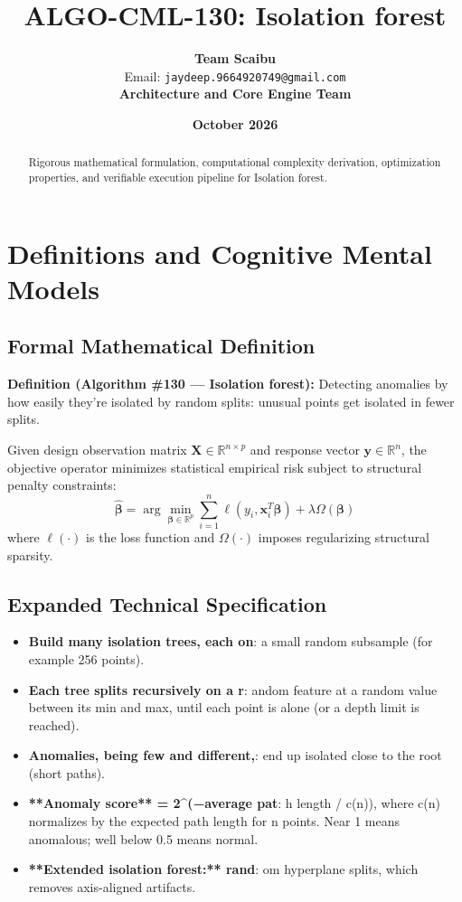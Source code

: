 \documentclass[11pt,a4paper]{article}
\title{\textbf{ALGO-CML-130: Isolation forest}}
\author{\textbf{Team Scaibu} \\ \small Email: \texttt{jaydeep.9664920749@gmail.com} \\ \small \textbf{Architecture and Core Engine Team}}
\date{\textbf{October 2026}}
\theoremstyle{definition}
\begin{document}
\maketitle

\begin{abstract}
Rigorous mathematical formulation, computational complexity derivation, optimization properties, and verifiable execution pipeline for Isolation forest.
\end{abstract}

\section{Definitions and Cognitive Mental Models}

\subsection{Formal Mathematical Definition}
\textbf{Definition (Algorithm \#130 --- Isolation forest):}
Detecting anomalies by how easily they're isolated by random splits: unusual points get isolated in fewer splits.

Given design observation matrix $\mathbf{X} \in \mathbb{R}^{n \times p}$ and response vector $\mathbf{y} \in \mathbb{R}^n$, the objective operator minimizes statistical empirical risk subject to structural penalty constraints:
\begin{equation}
\hat{\boldsymbol{\beta}} = \arg\min_{\boldsymbol{\beta} \in \mathbb{R}^p} \sum_{i=1}^n \ell(y_i, \mathbf{x}_i^T \boldsymbol{\beta}) + \lambda \Omega(\boldsymbol{\beta})
\end{equation}
where $\ell(\cdot)$ is the loss function and $\Omega(\cdot)$ imposes regularizing structural sparsity.

\subsection{Expanded Technical Specification}
\begin{itemize}
\item \textbf{Build many isolation trees, each on}:  a small random subsample (for example 256 points).
\item \textbf{Each tree splits recursively on a r}: andom feature at a random value between its min and max, until each point is alone (or a depth limit is reached).
\item \textbf{Anomalies, being few and different,}:  end up isolated close to the root (short paths).
\item \textbf{**Anomaly score** = 2^(−average pat}: h length / c(n)), where c(n) normalizes by the expected path length for n points. Near 1 means anomalous; well below 0.5 means normal.
\item \textbf{**Extended isolation forest:** rand}: om hyperplane splits, which removes axis-aligned artifacts.
\end{itemize}
\end{document}
